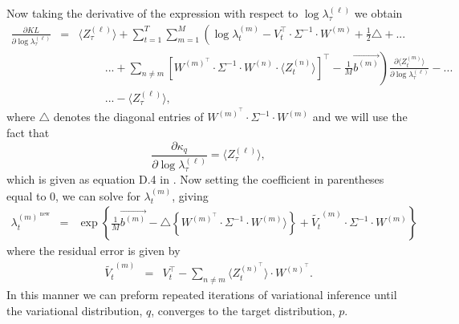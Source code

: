 \documentclass{amsart}
\begin{document}
Now taking the derivative of the expression with respect to $\log 
\lambda_\tau^{(\ell)}$ we obtain
\begin{eqnarray*}
\frac{\partial KL}{\partial \log \lambda_\tau^{(\ell)}} &= & \langle Z_\tau^{(\ell)}\rangle +
\sum_{t=1}^T\sum_{m=1}^M\left(\log\lambda_{t}^{(m)} -V_t^\intercal \cdot \Sigma^{-1}\cdot 
W^{(m)}+\frac{1}{2}\triangle\right.+...\\
&&\hspace{1cm}...+\sum_{n\neq m} 
\left[W^{(m)^\intercal}\cdot \Sigma^{-1}\cdot W^{(n)}\cdot \langle 
Z_t^{(n)}\rangle\right]^\intercal-\frac{1}{M}\left.\overrightarrow{b^{(m)}}\right)\frac{\partial \langle 
Z_t^{(m)}\rangle}{\partial \log \lambda_\tau^{(\ell)}} -...\\
&&\hspace{1cm}... - \langle Z_\tau^{(\ell)}\rangle,
\end{eqnarray*}
where $\triangle$ denotes the diagonal entries of $W^{(m)^\intercal}\cdot \Sigma^{-1}\cdot 
W^{(m)}$ and we will use the fact that 
\[
\frac{\partial \kappa_q}{\partial \log \lambda_\tau^{(\ell)}} = 
\langle Z_\tau^{(\ell)}\rangle,
\]
which is given as equation D.4 in \cite[Appendix D]{GJ95}.  Now setting 
the coefficient in parentheses equal to 0, we can solve for 
$\lambda_t^{(m)}$, giving 
\begin{eqnarray*}
\lambda_t^{(m)^\text{ new}} & = & 
\exp\left\{\frac{1}{M}\overrightarrow{b^{(m)}}-\triangle\left\{W^{(m)^\intercal}\cdot \Sigma^{-1}\cdot 
W^{(m)}\rangle\right\} + \widetilde{V_t}^{(m)}\cdot \Sigma^{-1}\cdot 
W^{(m)}\right\} 
\end{eqnarray*}
where the residual error is given by 
\begin{eqnarray*}
\widetilde{V_t}^{(m)} &=&V_t^\intercal - \sum_{n\neq m}\langle 
Z_t^{(n)^\intercal}\rangle \cdot W^{(n)^\intercal}.
\end{eqnarray*}
In this manner we can preform repeated iterations of variational 
inference until the variational distribution, $q$, converges to the 
target distribution, $p$. 










\end{document}
